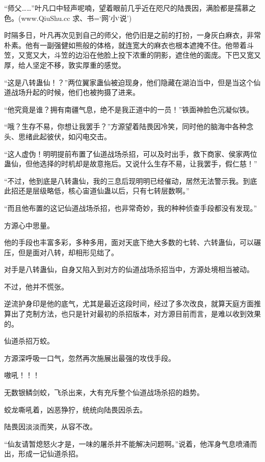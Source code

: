 
\begin{this_body}

“师父……”叶凡口中轻声呢喃，望着眼前几乎近在咫尺的陆畏因，满脸都是孺慕之色。(www.QiuShu.cc 求、书=‘网’小‘说’)

时隔多日，叶凡再次见到自己的师父，他仍旧是之前的打扮，一身灰白麻衣，非常朴素。他有一副强健如熊般的体格，就连宽大的麻衣也根本遮掩不住。他带着斗笠，又宽又大，斗笠的边沿在他脸上投下浓重的阴影，遮住他的面庞。下巴又宽又厚，给人坚定不移，敦实厚重的感觉。

“这是八转蛊仙！？”两位翼家蛊仙被迫现身，他们隐藏在湖泊当中，但是当这个仙道战场升起的时候，他们也被拘摄了进来。

“他究竟是谁？拥有南疆气息，绝不是我正道中的一员！”铁面神脸色沉凝似铁。

“哦？生存不易，你想让我罢手？”方源望着陆畏因冷笑，同时他的脑海中各种念头、思绪此起彼伏，如闪电交击。

“这人虚伪！明明提前布置了仙道战场杀招，可以及时出手，救下商家、侯家两位蛊仙，但他选择的时机却是故意拖后。又说什么生存不易，让我罢手，假仁慈！”

“不过，他到底是八转蛊仙，我的三息后现明明已经催动，居然无法警示我。到底此招还是层级略低，核心宙道仙蛊以后，只有七转层数啊。”

“而且他布置的这记仙道战场杀招，也非常奇妙，我的种种侦查手段都没有发现。”

方源心中思量。

他的手段也丰富多彩，多种多用，面对天底下绝大多数的七转、六转蛊仙，可以碾压，但是面对八转，却相形见绌了。

对手是八转蛊仙，自身又陷入到对方的仙道战场杀招当中，方源处境相当被动。

不过，他并不慌张。

逆流护身印是他的底气，尤其是最近这段时间，经过了多次改良，就算天庭方面推算出了克制方法，也只是针对最初的杀招版本，对方源目前而言，是难以收到效果的。

仙道杀招万蛟。

方源深呼吸一口气，忽然再次施展出最强的攻伐手段。

嗷吼！！！

无数银鳞剑蛟，飞杀出来，大有充斥整个仙道战场杀招的趋势。

蛟龙嘶吼着，凶恶狰狞，统统向陆畏因杀去。

陆畏因淡淡而笑，从容不改。

“仙友请暂熄怒火才是，一味的屠杀并不能解决问题啊。”说着，他浑身气息喷涌而出，形成一记仙道杀招。


\end{this_body}
